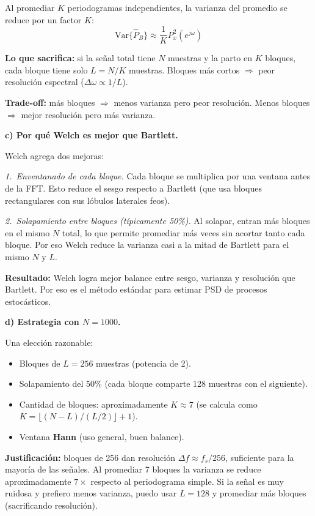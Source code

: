 \documentclass[11pt, a4paper]{article}
\begin{document}
Al promediar $K$ periodogramas independientes, la varianza del promedio se
reduce por un factor $K$:
\[
  \text{Var}\{\hat{P}_B\} \approx \frac{1}{K} P_x^2(e^{j\omega})
\]

\textbf{Lo que sacrifica:}
si la se\~nal total tiene $N$ muestras y la parto en $K$ bloques, cada bloque
tiene solo $L = N/K$ muestras.
Bloques m\'as cortos $\Rightarrow$ peor resoluci\'on espectral
($\Delta\omega \propto 1/L$).

\textbf{Trade-off:} m\'as bloques $\Rightarrow$ menos varianza pero peor resoluci\'on.
Menos bloques $\Rightarrow$ mejor resoluci\'on pero m\'as varianza.

\textbf{c) Por qu\'e Welch es mejor que Bartlett.}

Welch agrega dos mejoras:

\emph{1.~Enventanado de cada bloque.}
Cada bloque se multiplica por una ventana antes de la FFT.
Esto reduce el sesgo respecto a Bartlett (que usa bloques rectangulares
con sus l\'obulos laterales feos).

\emph{2.~Solapamiento entre bloques (t\'ipicamente 50\%).}
Al solapar, entran m\'as bloques en el mismo $N$ total, lo que permite
promediar m\'as veces sin acortar tanto cada bloque.
Por eso Welch reduce la varianza casi a la mitad de Bartlett
para el mismo $N$ y $L$.

\textbf{Resultado:} Welch logra mejor balance entre sesgo, varianza y
resoluci\'on que Bartlett. Por eso es el m\'etodo est\'andar para
estimar PSD de procesos estoc\'asticos.

\textbf{d) Estrategia con $N = 1000$.}

Una elecci\'on razonable:
\begin{itemize}[noitemsep]
  \item Bloques de \textbf{$L = 256$} muestras (potencia de 2).
  \item Solapamiento del 50\% (cada bloque comparte 128 muestras con el siguiente).
  \item Cantidad de bloques: aproximadamente $K \approx 7$ (se calcula como
    $K = \lfloor (N - L)/(L/2) \rfloor + 1$).
  \item Ventana \textbf{Hann} (uso general, buen balance).
\end{itemize}

\textbf{Justificaci\'on:} bloques de 256 dan resoluci\'on
$\Delta f \approx f_s / 256$, suficiente para la mayor\'ia de las
se\~nales. Al promediar 7 bloques la varianza se reduce
aproximadamente $7\times$ respecto al periodograma simple.
Si la se\~nal es muy ruidosa y prefiero menos varianza, puedo usar $L = 128$
y promediar m\'as bloques (sacrificando resoluci\'on).
\end{document}
